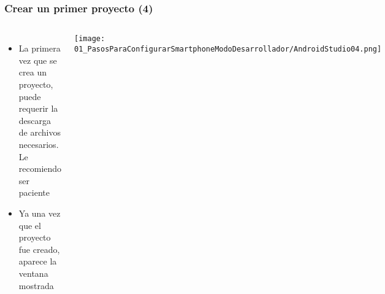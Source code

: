\begin{frame}
\frametitle{Crear un primer proyecto (4)}  
\begin{columns}
\begin{itemize}
\item La primera vez que se crea un proyecto, puede requerir la descarga de archivos necesarios. Le recomiendo ser paciente
\item Ya una vez que el proyecto fue creado, aparece la ventana mostrada
\end{itemize}
\begin{center}
\texttt{[image: 01\_PasosParaConfigurarSmartphoneModoDesarrollador/AndroidStudio04.png]}    
\end{center}
\end{columns}
\end{frame}

